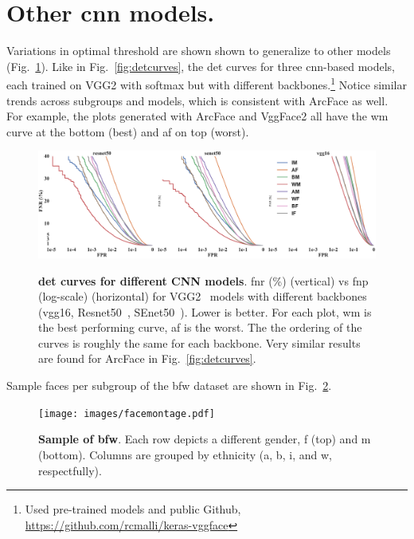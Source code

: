




% 
\onecolumn
\renewcommand{\thesection}{\alph{section}}
\glsresetall
\setcounter{section}{0}

\section{Other \gls{cnn} models.}
Variations in optimal threshold are shown shown to generalize to other models (Fig.~\ref{fig:sdm-appendix-a}). Like in Fig.~\ref{fig:detcurves}, the \gls{det} curves for three \gls{cnn}-based models, each trained on VGG2 with softmax but with different backbones.\footnote{Used pre-trained models and public Github, \href{https://github.com/rcmalli/keras-vggface}{https://github.com/rcmalli/keras-vggface}} Notice similar trends across subgroups and models, which is consistent with  ArcFace as well. For example, the plots generated with ArcFace and VggFace2 all have the \gls{wm} curve at the bottom (\ie best) and \gls{af} on top (\ie worst).

\begin{figure}[h!]
    \centering
    \includegraphics[width=.9\linewidth, trim={0mm 0mm 0mm 0mm},clip]{images/SDM.pdf}\\
    \caption{\textbf{\gls{det} curves for different CNN models}. \gls{fnr} (\%) (vertical) vs \gls{fnp} (log-scale)  (horizontal) for VGG2~\cite{Cao18} models with different backbones (vgg16, Resnet50~\cite{he2016deep}, SEnet50~\cite{hu2018squeeze}). Lower is better. For each plot, \gls{wm} is the best performing curve, \gls{af} is the worst. The the ordering of the curves is roughly the same for each backbone. Very similar results are found for ArcFace in Fig.~\ref{fig:detcurves}.
    }\label{fig:sdm-appendix-a}
\end{figure}

Sample faces per subgroup of the \gls{bfw} dataset are shown in Fig.~\ref{fig:montage:app}.
\begin{figure}[h!]
    \centering
    \texttt{[image: images/facemontage.pdf]}
    \caption{\textbf{Sample of \gls{bfw}}. Each row depicts a different gender, \gls{f} (top) and \gls{m} (bottom). Columns are grouped by ethnicity (\ie \gls{a}, \gls{b}, \gls{i}, and \gls{w}, respectfully).}
    \label{fig:montage:app}
\end{figure}